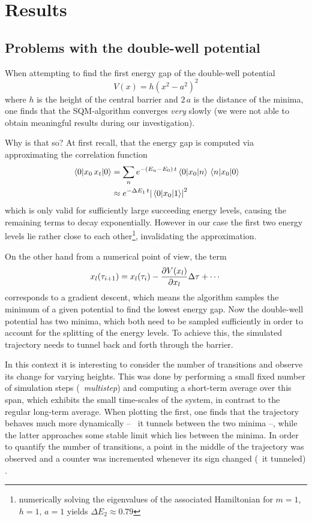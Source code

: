 \section{Results}
\subsection{Problems with the double-well potential}
When attempting to find the first energy gap of the double-well potential
\begin{equation}
    V(x)=h\left(x^2-a^2\right)^2
    \label{eq:double-well}
\end{equation}
where $h$ is the height of the central barrier and $2\,a$ is the distance of the
minima, one finds that the SQM-algorithm converges \emph{very} slowly (we were not
able to obtain meaningful results during our investigation).

Why is that so? At first recall, that the energy gap is computed via
approximating the correlation function
\begin{align*}
    \ev{x_0\,x_t}{0}&=\sum_{n}e^{-(E_n-E_0)\,t}\mel{0}{x_0}{n}\mel{n}{x_0}{0}
    \\&\approx{e^{-\Delta{E_1}\,t}}\abs{\mel{0}{x_0}{1}}^2
\end{align*}
which is only valid for sufficiently large succeeding energy levels, causing
the remaining terms to decay exponentially. However in our case the first two
energy levels lie rather close to each other\footnote{numerically solving the
eigenvalues of the associated Hamiltonian for $m=1$, $h=1$, $a=1$ yields
$\Delta{E_2}\approx0.79$}, invalidating the approximation.

On the other hand from a numerical point of view, the term
\begin{equation*}
    x_l(\tau_{i+1})=x_l(\tau_i)-\pdv{V(x_l)}{x_l}\Delta\tau+\dotsb
\end{equation*}
corresponds to a gradient descent, which means the algorithm samples the
minimum of a given potential to find the lowest energy gap. Now the double-well
potential has two minima, which both need to be sampled sufficiently in order
to account for the splitting of the energy levels. To achieve this, the
simulated trajectory needs to tunnel back and forth through the barrier.

In this context it is interesting to consider the number of transitions and
observe its change for varying heights. This was done by performing a small
fixed number of simulation steps (\textrightarrow~\emph{multistep}) and
computing a short-term average over this span, which exhibits the small
time-scales of the system, in contrast to the regular long-term average. When
plotting the first, one finds that the trajectory behaves much more dynamically
-- \eg~it tunnels between the two minima --, while the latter approaches some
stable limit which lies between the minima. In order to quantify the number of
transitions, a point in the middle of the trajectory was observed and a
counter was incremented whenever its sign changed (\ie~it tunneled)
.

